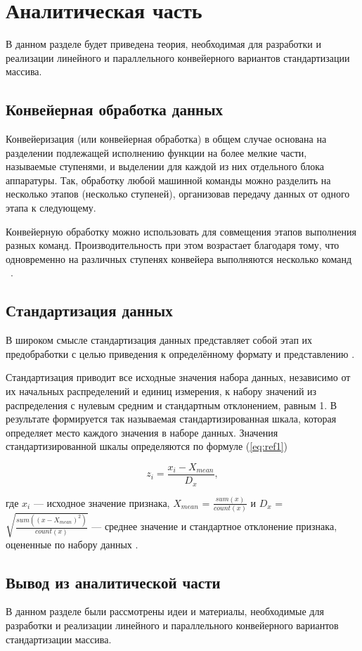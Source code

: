 \chapter{Аналитическая часть}

В данном разделе будет приведена теория, необходимая для разработки и реализации линейного и параллельного конвейерного вариантов стандартизации массива.

\section{Конвейерная обработка данных}

Конвейеризация (или конвейерная обработка) в общем случае основана на разделении подлежащей исполнению функции на более мелкие части, называемые ступенями, и выделении для каждой из них отдельного блока аппаратуры. Так, обработку любой машинной команды можно разделить на несколько этапов (несколько ступеней), организовав передачу данных от одного этапа к следующему. 

Конвейерную обработку можно использовать для совмещения этапов выполнения разных команд. Производительность при этом возрастает благодаря тому, что одновременно на различных ступенях конвейера выполняются несколько команд ~\cite{second_article}.


\section{Стандартизация данных}

В широком смысле стандартизация данных представляет собой этап их предобработки с целью приведения к определённому формату и представлению \cite{third_article}.

 Стандартизация приводит все исходные значения набора данных, независимо от их начальных распределений и единиц измерения, к набору значений из распределения с нулевым средним и стандартным отклонением, равным 1. В результате формируется так называемая стандартизированная шкала, которая определяет место каждого значения в наборе данных. Значения стандартизированной шкалы определяются по формуле (\ref{eq:ref1})
 
 \begin{equation}
 	z_i = \frac{x_i - X_{mean}}{D_x},\label{eq:ref1}
 \end{equation}

где $x_i$ — исходное значение признака, $X_{mean}$ =  $\frac{sum(x)}{count(x)}$ и $D_x$ = $\sqrt{\frac{sum((x - X_{mean})^2)}{count(x)}}$ — среднее значение и стандартное отклонение признака, оцененные по набору данных \cite{fourth_article}.




\section{Вывод из аналитической части}
В данном разделе были рассмотрены идеи и материалы, необходимые для разработки и реализации линейного и параллельного конвейерного вариантов стандартизации массива.

